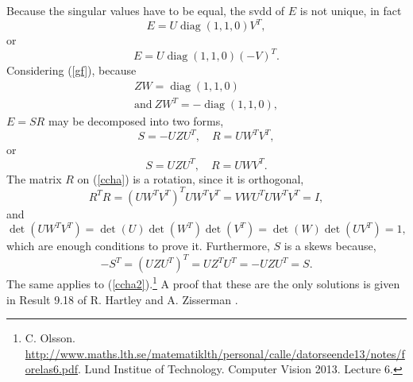 Because the singular values have to be equal, the \acrshort{svdd} of $E$ is not unique, in fact 
\begin{equation}
\label{gf}
E = U \operatorname { diag } ( 1,1,0 ) V ^ { T },
\end{equation}
or 
\begin{equation}
E = U \operatorname { diag } ( 1,1,0 ) ( - V ) ^ { T }.
\end{equation} 
Considering (\ref{gf}), because
\begin{equation}
\begin{aligned} 
Z W = \operatorname { diag } ( 1,1,0 ) \\ 
\text{and} \
Z W ^ { T } = - \operatorname { diag } ( 1,1,0 ) ,
\end{aligned}
\end{equation}
$E=SR$ may be decomposed into two forms,
\begin{equation}
\label{ccha}
S = - U Z U ^ { T } , \quad R = U W ^ { T } V ^ { T },
\end{equation}
or
\begin{equation}
\label{ccha2}
S = U Z U ^ { T } , \quad R = U W V ^ { T }.
\end{equation}
The matrix $R$ on (\ref{ccha}) is a rotation, since it is orthogonal,
\begin{equation}
R ^ { T } R = \left( U W ^ { T } V ^ { T } \right) ^ { T } U W ^ { T } V ^ { T } = V W U ^ { T } U W ^ { T } V ^ { T } = I,
\end{equation}
and 
\begin{equation}
\operatorname { det } \left( U W ^ { T } V ^ { T } \right) = \operatorname { det } ( U ) \operatorname { det } \left( W ^ { T } \right) \operatorname { det } \left( V ^ { T } \right) = \operatorname { det } ( W ) \operatorname { det } \left( U V ^ { T } \right) = 1,
\end{equation}
which are enough conditions to prove it. Furthermore, $S$ is a \gls{skews} because,
\begin{equation}
- S^ { T } = \left( U Z U ^ { T } \right) ^ { T } = U Z ^ { T } U ^ { T } = - U Z U ^ { T } = S.
\end{equation}
The same applies to (\ref{ccha2}).\footnote{C. Olsson. \href{http://www.maths.lth.se/matematiklth/personal/calle/datorseende13/notes/forelas6.pdf}{http://www.maths.lth.se/matematiklth/personal/calle/datorseende13/notes/forelas6.pdf}. Lund Institue of Technology. Computer Vision 2013. Lecture 6.} A proof that these are the only solutions is given in Result 9.18 of R. Hartley and A. Zisserman \cite{multiview}.

